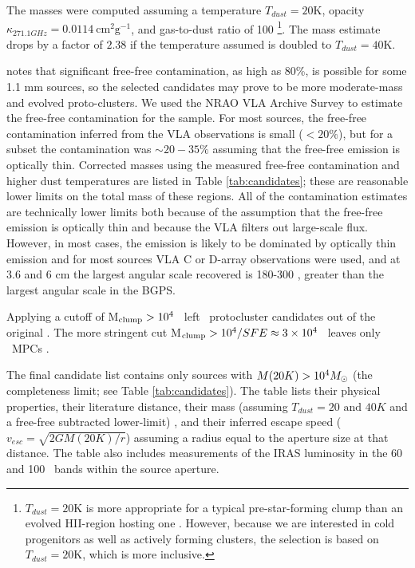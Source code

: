 The masses were computed assuming a temperature $T_{dust}=20$K, opacity
$\kappa_{271.1 GHz} = 0.0114~\mathrm{cm}^2 \mathrm{g}^{-1}$, and gas-to-dust
ratio of 100  \citep{Aguirre2011} \footnote{$T_{dust}=20$K is more appropriate
for a typical pre-star-forming clump than an evolved HII-region hosting one
\citep[e.g.]{Dunham2010}. However, because we are interested in cold
progenitors as well as actively forming clusters, the selection is based on
$T_{dust}=20$K, which is more inclusive. }.  The mass estimate drops by a
factor of $2.38$ if the temperature assumed is doubled to $T_{dust}=40$K.  

\citet{Ginsburg2011} notes that significant free-free contamination, as high as
80\%, is possible for some 1.1 mm sources, so the selected candidates may prove
to be more moderate-mass and evolved proto-clusters.  We used the NRAO VLA
Archive Survey \citep[NVAS;][]{Crossley2008} to estimate the free-free
contamination for the sample.  For most sources, the free-free contamination
inferred from the VLA observations is small ($<20\%$), but for a subset the
contamination was $\sim20-35\%$ assuming that the free-free emission is
optically thin.  Corrected masses using the measured free-free contamination
and higher dust temperatures are listed in Table \ref{tab:candidates}; these
are reasonable lower limits on the total mass of these regions.  All of the
contamination estimates are technically lower limits both because of the
assumption that the free-free emission is optically thin and because the VLA
filters out large-scale flux.  However, in most cases, the emission is likely
to be dominated by optically thin emission \citep[evolved HII regions tend to
be optically thin and bright, while compact HII regions are optically thick but
relatively faint;][]{Keto2002} and for most sources VLA C or D-array
observations were used, and at 3.6 and 6 cm the largest angular scale recovered
is 180-300 \arcsec, greater than the largest angular scale in the BGPS.  

Applying a cutoff of M$_{\rm clump} > 10^4$ \msun\ left \ncandidates\
protocluster candidates out of the original \nsample.  The more stringent cut
M$_{\rm clump} > 10^4 / SFE \approx 3\times10^{4}$ \msun\ leaves only \nMPC\ MPCs . 

The final candidate list contains only sources with $M(20K)>10^4 M_{\odot}$ (the
completeness limit; see Table \ref{tab:candidates}).  The table lists
their physical properties, their literature distance, their mass (assuming $T_{dust}=20
\textrm{~and~} 40 K$ and a free-free subtracted lower-limit) ,
and their inferred escape speed ($v_{esc} = \sqrt{2 G M(20K) / r}$) assuming a
radius equal to the aperture size at that distance.  The table also includes
measurements of the IRAS luminosity in the 60 and 100 \um\ bands within the
source aperture.

